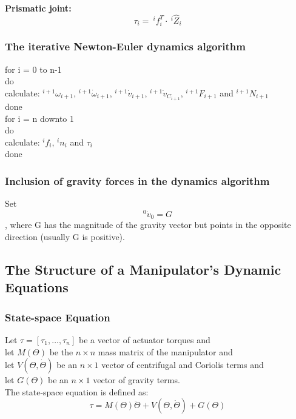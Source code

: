 \documentclass[10pt,a4paper]{article}
\newcommand{\tab}[1][1]{\hspace*{#1cm}}
\begin{document}
\textbf{Prismatic joint:} \\
$$
\tau_i = ~^if_i^T ⋅ ~^i\hat{Z}_i
$$

\subsubsection{The iterative Newton-Euler dynamics algorithm}
for i = 0 to n-1 \\
do \\
\tab	calculate: $^{i+1}\omega_{i+1}$, $^{i+1}\dot \omega_{i+1}$, $^{i+1}\dot v_{i+1}$, $^{i+1}\dot v_{C_{i+1}}$, $^{i+1}F_{i+1}$ and $^{i+1}N_{i+1}$ \\
done \\

for i = n downto 1\\ 
do \\
\tab	calculate: $^if_i$, $^in_i$ and $\tau_i$ \\
done \\

\subsubsection{Inclusion of gravity forces in the dynamics algorithm}
Set 
$$
^0\dot v_0 = G
$$
, where G has the magnitude of the gravity vector but points in the opposite direction (usually G is positive).

\subsection{The Structure of a Manipulator's Dynamic Equations}
\subsubsection{State-space Equation}
Let $\tau = [\tau_1, \dots, \tau_n]$ be a vector of actuator torques and \\
let $M(\Theta)$ be the $n \times n$ mass matrix of the manipulator and \\
let $V(\Theta, \dot{\Theta})$ be an $n \times 1$ vector of centrifugal and Coriolis terms and \\
let $G(\Theta)$ be an $n \times 1$ vector of gravity terms. \\
The state-space equation is defined as: \\
$$
\tau = M(\Theta)\ddot{\Theta} + V(\Theta, \dot{\Theta}) + G(\Theta)
$$
\end{document}
